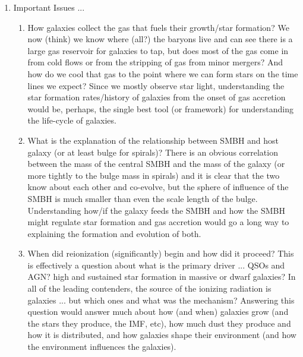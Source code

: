 \documentclass[11pt]{article}
\begin{document}
\begin{enumerate}
\begin{enumerate}
  
  \item Important Issues ...
	  \begin{enumerate}
	  \item How galaxies collect the gas that fuels their growth/star formation? We now (think) we know where (all?) the baryons live and can see there is a large gas reservoir for galaxies to tap, but does most of the gas come in from cold flows or from the stripping of gas from minor mergers? And how do we cool that gas to the point where we can form stars on the time lines we expect? Since we mostly observe star light, understanding the star formation rates/history of galaxies from the onset of gas accretion would be, perhaps, the single best tool (or framework) for understanding the life-cycle of galaxies.\\
	  
	  \item What is the explanation of the relationship between SMBH and host galaxy (or at least bulge for spirals)? There is an obvious correlation between the mass of the central SMBH and the mass of the galaxy (or more tightly to the bulge mass in spirals) and it is clear that the two know about each other and co-evolve, but the sphere of influence of the SMBH is much smaller than even the scale length of the bulge. Understanding how/if the galaxy feeds the SMBH and how the SMBH might regulate star formation and gas accretion would go a long way to explaining the formation and evolution of both.\\
	  
	  \item When did reionization (significantly) begin and how did it proceed? This is effectively a question about what is the primary driver ... QSOs and AGN? high and sustained star formation in massive or dwarf galaxies? In all of the leading contenders, the source of the ionizing radiation is galaxies ... but which ones and what was the mechanism? Answering this question would answer much about how (and when) galaxies grow (and the stars they produce, the IMF, etc), how much dust they produce and how it is distributed, and how galaxies shape their environment (and how the environment influences the galaxies). 
	  
	  \end{enumerate}
  
  
  \end{enumerate}

\end{enumerate}
\end{document}
